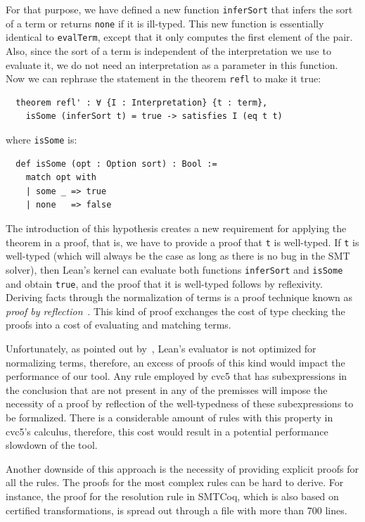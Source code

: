 For that purpose, we have defined a new function \texttt{inferSort} that infers the sort of a term
or returns \texttt{none} if it is ill-typed.
This new function is essentially identical to
\texttt{evalTerm}, except that it only computes the first element of the pair.
Also, since the sort of a term is independent of the interpretation we use
to evaluate it, we do not need an interpretation as a parameter in this function.
Now we can rephrase the statement in the theorem \texttt{refl} to make it true:

\begin{verbatim}
  theorem refl' : ∀ {I : Interpretation} {t : term},
    isSome (inferSort t) = true -> satisfies I (eq t t)
\end{verbatim}

where \texttt{isSome} is:

\begin{verbatim}
  def isSome (opt : Option sort) : Bool :=
    match opt with
    | some _ => true
    | none   => false
\end{verbatim}

The introduction of this hypothesis creates a new requirement for applying
the theorem in a proof, that is, we have to provide a proof that \texttt{t} is well-typed.
%
If \texttt{t} is well-typed (which will always be the case as long
as there is no bug in the SMT solver), then Lean's kernel can evaluate
both functions \texttt{inferSort} and \texttt{isSome} and obtain \texttt{true},
and the proof that it is well-typed follows by reflexivity.
%
Deriving facts through the normalization of terms is a proof technique known as
\textit{proof by reflection}~\cite{reflProof}.
%
This kind of proof exchanges the cost of type checking the proofs into a cost of
evaluating and matching terms.

Unfortunately, as pointed out by~\cite{ringLean}, Lean's evaluator
is not optimized for normalizing terms, therefore, an excess of proofs
of this kind would impact the performance of our tool.
%
Any rule employed by cvc5 that has subexpressions in the conclusion that are
not present in any of the premisses will impose the necessity of a proof
by reflection of the well-typedness of these subexpressions to be formalized.
%
There is a considerable amount of rules with this property in cvc5's calculus,
therefore, this cost would result in a potential performance slowdown of the tool.

Another downside of this approach is the necessity of providing explicit proofs for all
the rules. The proofs for the most complex rules can be hard to derive.
%
For instance, the proof for the resolution rule in SMTCoq,
which is also based on certified transformations, is spread out through a file with more than
700 lines. 

